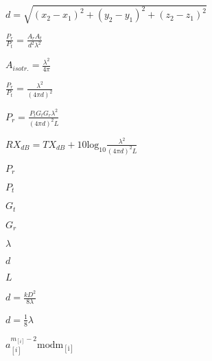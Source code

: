 \documentclass{article}
\begin{document}
$d = \sqrt{(x_2 - x_1)^2 + (y_2 - y_1)^2 + (z_2 - z_1)^2}$
\pagebreak

$ \frac{P_r}{P_t} = \frac{A_r A_t}{d^2\lambda^2} $
\pagebreak

$ A_{isotr.} = \frac{\lambda^2}{4\pi} $
\pagebreak

$ \frac{P_r}{P_t} = \frac{\lambda^2}{(4 \pi d)^2} $
\pagebreak

$ P_r = \frac{P_t G_t G_r \lambda^2}{(4 \pi d)^2 L}$
\pagebreak

$ RX_{dB} = TX_{dB} + 10\mathrm{log_{10}} \frac{\lambda^2}{(4 \pi d)^2 L}$
\pagebreak

$ P_r $
\pagebreak

$ P_t $
\pagebreak

$ G_t $
\pagebreak

$ G_r $
\pagebreak

$ \lambda $
\pagebreak

$ d $
\pagebreak

$ L $
\pagebreak

$ d = \frac{kD^2}{8\lambda} $
\pagebreak

$ d = \frac{1}{8}\lambda $
\pagebreak

$ a_[i]^{m_[i] - 2} \mathrm{mod m_[i]} $
\pagebreak
\end{document}
